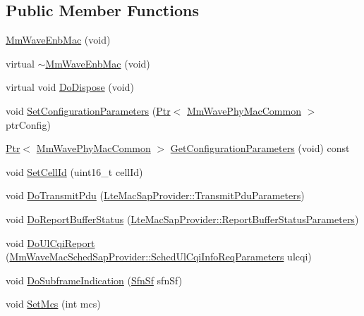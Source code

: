 \subsection*{Public Member Functions}
\begin{DoxyCompactItemize}
\item 
\hyperlink{classns3_1_1MmWaveEnbMac_a2939e93d7002c8248b1343ab9d026538}{Mm\+Wave\+Enb\+Mac} (void)
\item 
virtual \hyperlink{classns3_1_1MmWaveEnbMac_a9045c289781158c79199ebc358d454fb}{$\sim$\+Mm\+Wave\+Enb\+Mac} (void)
\item 
virtual void \hyperlink{classns3_1_1MmWaveEnbMac_a537bedd9fcf5e733ce44909499d6ea08}{Do\+Dispose} (void)
\item 
void \hyperlink{classns3_1_1MmWaveEnbMac_a86b7d96f0dc8041aeca09d9da8c32a17}{Set\+Configuration\+Parameters} (\hyperlink{classns3_1_1Ptr}{Ptr}$<$ \hyperlink{classns3_1_1MmWavePhyMacCommon}{Mm\+Wave\+Phy\+Mac\+Common} $>$ ptr\+Config)
\item 
\hyperlink{classns3_1_1Ptr}{Ptr}$<$ \hyperlink{classns3_1_1MmWavePhyMacCommon}{Mm\+Wave\+Phy\+Mac\+Common} $>$ \hyperlink{classns3_1_1MmWaveEnbMac_a7fce49b73912676386a7832dbfef9a2f}{Get\+Configuration\+Parameters} (void) const 
\item 
void \hyperlink{classns3_1_1MmWaveEnbMac_abee8ee382e6c949f104fc212689f42d6}{Set\+Cell\+Id} (uint16\+\_\+t cell\+Id)
\item 
void \hyperlink{classns3_1_1MmWaveEnbMac_a71a93e997a6016541b33e26998562226}{Do\+Transmit\+Pdu} (\hyperlink{structns3_1_1LteMacSapProvider_1_1TransmitPduParameters}{Lte\+Mac\+Sap\+Provider\+::\+Transmit\+Pdu\+Parameters})
\item 
void \hyperlink{classns3_1_1MmWaveEnbMac_a9e7719930b408b4a4e26a328a59531b3}{Do\+Report\+Buffer\+Status} (\hyperlink{structns3_1_1LteMacSapProvider_1_1ReportBufferStatusParameters}{Lte\+Mac\+Sap\+Provider\+::\+Report\+Buffer\+Status\+Parameters})
\item 
void \hyperlink{classns3_1_1MmWaveEnbMac_a9ea7f5d8ae8f7dafdb6406d74f900a3e}{Do\+Ul\+Cqi\+Report} (\hyperlink{structns3_1_1MmWaveMacSchedSapProvider_1_1SchedUlCqiInfoReqParameters}{Mm\+Wave\+Mac\+Sched\+Sap\+Provider\+::\+Sched\+Ul\+Cqi\+Info\+Req\+Parameters} ulcqi)
\item 
void \hyperlink{classns3_1_1MmWaveEnbMac_a80f4080d71a3fe61b6e90b0c73b89ea7}{Do\+Subframe\+Indication} (\hyperlink{structns3_1_1SfnSf}{Sfn\+Sf} sfn\+Sf)
\item 
void \hyperlink{classns3_1_1MmWaveEnbMac_aeba23d0fd28ab3fffb34f514fd1282e8}{Set\+Mcs} (int mcs)

\end{DoxyCompactItemize}
